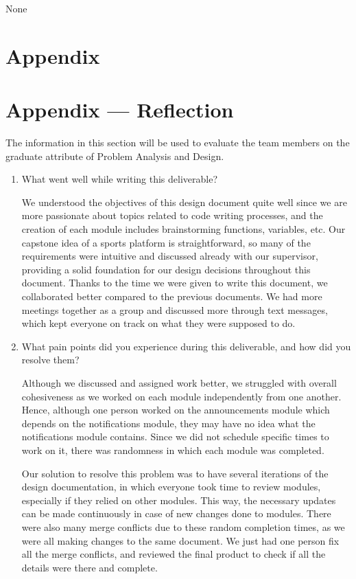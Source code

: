 \documentclass[12pt, titlepage]{article}
\begin{document}
None

\section{Appendix} \label{Appendix}

\newpage{}

\section*{Appendix --- Reflection}

The information in this section will be used to evaluate the team members on the
graduate attribute of Problem Analysis and Design.



\begin{enumerate}
  \item What went well while writing this deliverable?

        We understood the objectives of this design document quite well since we are more passionate about topics related to code writing processes, and the creation of each module includes brainstorming functions, variables, etc. Our capstone idea of a sports platform is straightforward, so many of the requirements were intuitive and discussed already with our supervisor, providing a solid foundation for our design decisions throughout this document. Thanks to the time we were given to write this document, we collaborated better compared to the previous documents. We had more meetings together as a group and discussed more through text messages, which kept everyone on track on what they were supposed to do.

  \item What pain points did you experience during this deliverable, and how
        did you resolve them?

        Although we discussed and assigned work better, we struggled with overall cohesiveness as we worked on each module independently from one another. Hence, although one person worked on the announcements module which depends on the notifications module, they may have no idea what the notifications module contains. Since we did not schedule specific times to work on it, there was randomness in which each module was completed.

        Our solution to resolve this problem was to have several iterations of the design documentation, in which everyone took time to review modules, especially if they relied on other modules. This way, the necessary updates can be made continuously in case of new changes done to modules. There were also many merge conflicts due to these random completion times, as we were all making changes to the same document. We just had one person fix all the merge conflicts, and reviewed the final product to check if all the details were there and complete.


\end{enumerate}
\end{document}
